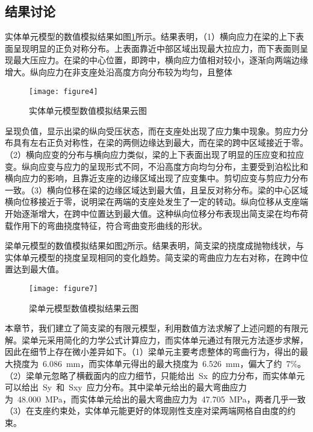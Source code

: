 \subsection{结果讨论}
\label{cha:discussion2}
实体单元模型的数值模拟结果如图\ref{fig:fea}所示。结果表明，（1）横向应力在梁的上下表面呈现明显的正负对称分布。上表面靠近中部区域出现最大拉应力，而下表面则呈现最大压应力。在梁的中心位置，即跨中，横向应力值相对较小，逐渐向两端边缘增大。纵向应力在非支座处沿高度方向分布较为均匀，且整体\begin{figure}[htbp]
    \centering
	\texttt{[image: figure4]}
    \caption{实体单元模型数值模拟结果云图}
    \label{fig:fea}
\end{figure}呈现负值，显示出梁的纵向受压状态，而在支座处出现了应力集中现象。剪应力分布具有左右正负对称性，在梁的两侧边缘达到最大，而在梁的跨中区域接近于零。（2）横向应变的分布与横向应力类似，梁的上下表面出现了明显的压应变和拉应变。纵向应变与应力的呈现形式不同，不沿高度方向均匀分布，主要受到泊松比和横向应力的影响，且靠近支座的边缘区域出现了应变集中。剪切应变与剪应力分布一致。（3）横向位移在梁的边缘区域达到最大值，且呈反对称分布。梁的中心区域横向位移接近于零，说明梁在两端的支座处发生了一定的转动。纵向位移从支座端开始逐渐增大，在跨中位置达到最大值。这种纵向位移分布表现出简支梁在均布荷载作用下的弯曲挠度特征，符合弯曲变形曲线的形状。

梁单元模型的数值模拟结果如图\ref{fig:BEAMfea}所示。结果表明，简支梁的挠度成抛物线状，与实体单元模型的挠度呈现相同的变化趋势。简支梁的弯曲应力左右对称，在跨中位置达到最大值。
\begin{figure}[htbp]
    \centering
	\texttt{[image: figure7]}
    \caption{梁单元模型数值模拟结果云图}
    \label{fig:BEAMfea}
\end{figure}

本章节，我们建立了简支梁的有限元模型，利用数值方法求解了上述问题的有限元解。梁单元采用简化的力学公式计算应力，而实体单元通过有限元方法逐步求解，因此在细节上存在微小差异如下。（1）梁单元主要考虑整体的弯曲行为，得出的最大挠度为~6.086~mm，而实体单元得出的最大挠度为~6.526~mm，偏大了约~7\%。（2）梁单元忽略了横截面内的应力细节，只能给出~Sx~的应力分布，而实体单元可以给出~Sy~和~Sxy~应力分布。其中梁单元给出的最大弯曲应力为~48.000~MPa，而实体单元给出的最大弯曲应力为~47.705~MPa，两者几乎一致（3）在支座约束处，实体单元能更好的体现刚性支座对梁两端网格自由度的约束。
